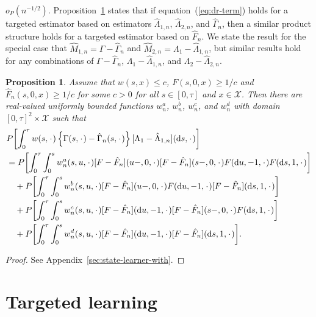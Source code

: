 \documentclass[11pt]{article}
\theoremstyle{thmstyleone}%
\newtheorem{proposition}{Proposition}
\theoremstyle{thmstyletwo}%
\theoremstyle{thmstylethree}%
\newcommand{\blank}{\makebox[1ex]{\textbf{$\cdot$}}}
\newcommand*\diff{\mathop{}\!\mathrm{d}}
\newcommand\smallO{\textit{o}}
\newcommand{\1}{\mathds{1}}
\begin{document}
\( \smallO_P{(n^{-1/2})}\). Proposition~\ref{prop:dr-structure} states that if
equation~(\ref{eq:dr-term}) holds for a targeted estimator based on estimators
$\hat{\Lambda}_{1,n}$, $\hat{\Lambda}_{2,n}$, and $\hat{\Gamma}_{n}$, then a
similar product structure holds for a targeted estimator based on
\( \hat{F}_n \). We state the result for the special case that
\(\hat{M}_{1,n}= \Gamma-\hat{\Gamma}_n \) and
\(\hat{M}_{2,n} =\Lambda_1-\hat{\Lambda}_{1,n} \), but similar results hold for
any combinations of \( \Gamma-\hat{\Gamma}_n\),
\( \Lambda_1-\hat{\Lambda}_{1,n} \), and \( \Lambda_2-\hat{\Lambda}_{2,n} \).
\begin{proposition}
  \label{prop:dr-structure}
  Assume that \( w(s,x)\leq c \), \( F(s, 0, x) \geq 1/c \) and
  \( \hat{F}_n(s, 0, x) \geq 1/c \) for some \( c>0 \) for all
  \( s \in [0, \tau] \) and \( x \in \mathcal{X} \). Then there are real-valued
  uniformly bounded functions \( w^a_n \), \( w^b_n \), \( w^c_n \), and
  \( w^d_n \) with domain \( [0,\tau]^2 \times \mathcal{X} \) such that
  \begin{align*}
    & P{\left[
      \int_0^{\tau} w(s, \blank)
      \left\{
      \Gamma(s,\blank) -\hat{\Gamma}_n(s,\blank)
      \right\}
      [\Lambda_1-\hat{\Lambda}_{1,n}]
      (\diff s, \blank)
      \right]}
    \\
     & =
      P{\left[
      \int_0^{\tau} \int_0^{s} w^a_n(s,u,\blank) [F - \hat{F}_n](u-, 0, \blank)[F - \hat{F}_n](s-, 0, \blank) F(\diff u, -1, \blank ) F ( \diff s, 1, \blank)
      \right]}
    \\
    & \quad +
      P{\left[
      \int_0^{\tau} \int_0^{s} w^b_n(s,u,\blank) [F - \hat{F}_n](u-, 0, \blank)
      F(\diff u, -1, \blank ) [F - \hat{F}_n](\diff s, 1, \blank)
      \right]}
    \\
    & \quad +
      P{\left[
      \int_0^{\tau} \int_0^{s} w^c_n(s,u,\blank) [F - \hat{F}_n](\diff u, -1, \blank)
      [F - \hat{F}_n](s-, 0, \blank)
      F(\diff s, 1, \blank ) 
      \right]}
    \\
    & \quad +
      P{\left[
      \int_0^{\tau} \int_0^{s} w^d_n(s,u,\blank) [F - \hat{F}_n](\diff u, -1, \blank)
      [F - \hat{F}_n](\diff s, 1, \blank)
      \right]}.
  \end{align*}
\end{proposition}
\begin{proof}
  See Appendix~\ref{sec:state-learner-with}.
\end{proof}

\section{Targeted learning}
\label{sec:targeted-learning}
\end{document}
